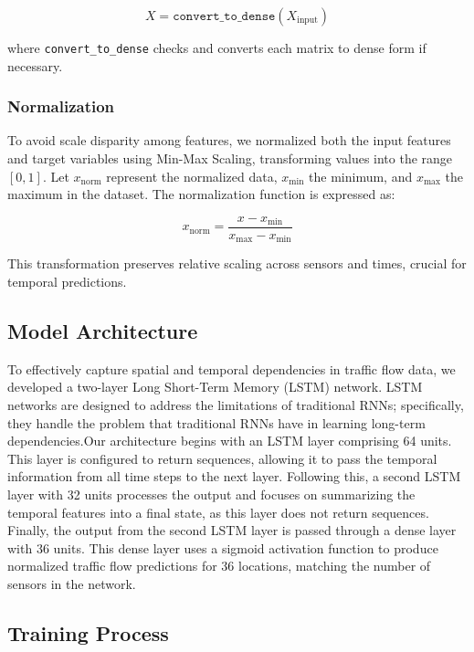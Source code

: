 \documentclass[conference]{IEEEtran}
\begin{document}
\begin{equation}
    X = \texttt{convert\_to\_dense}(X_{\text{input}})
\end{equation}

where \texttt{convert\_to\_dense} checks and converts each matrix to dense form if necessary.

\subsubsection{Normalization}

To avoid scale disparity among features, we normalized both the input features and target variables using Min-Max Scaling, transforming values into the range $[0, 1]$. Let $x_{\text{norm}}$ represent the normalized data, $x_{\text{min}}$ the minimum, and $x_{\text{max}}$ the maximum in the dataset. The normalization function is expressed as:

\begin{equation}
    x_{\text{norm}} = \frac{x - x_{\text{min}}}{x_{\text{max}} - x_{\text{min}}}
\end{equation}

This transformation preserves relative scaling across sensors and times, crucial for temporal predictions.

\subsection{Model Architecture}

To effectively capture spatial and temporal dependencies in traffic flow data, we developed a two-layer Long Short-Term Memory (LSTM) network. LSTM networks are designed to address the limitations of traditional RNNs; specifically, they handle the problem that traditional RNNs have in learning long-term dependencies.Our architecture begins with an LSTM layer comprising 64 units. This layer is configured to return sequences, allowing it to pass the temporal information from all time steps to the next layer. Following this, a second LSTM layer with 32 units processes the output and focuses on summarizing the temporal features into a final state, as this layer does not return sequences.
Finally, the output from the second LSTM layer is passed through a dense layer with 36 units. This dense layer uses a sigmoid activation function to produce normalized traffic flow predictions for 36 locations, matching the number of sensors in the network.


\subsection{Training Process}
\end{document}

